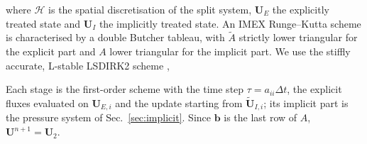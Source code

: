 where $\mathcal H$ is the spatial discretisation of the split system, $\mathbf U_E$ the explicitly treated state and $\mathbf U_I$ the
implicitly treated state. An IMEX Runge--Kutta scheme \cite{Ascher1997,PareschiRusso2005} is characterised by a double Butcher
tableau, with $\tilde A$ strictly lower triangular for the explicit part and $A$ lower triangular for the implicit part. We use the
stiffly accurate, L-stable LSDIRK2 scheme \cite{BoscarinoFilbetRusso2016,Avgerinos2019},

Each stage is the first-order scheme with the time step $\tau=a_{ii}\Delta t$, the explicit fluxes evaluated on $\mathbf U_{E,i}$ and
the update starting from $\tilde{\mathbf U}_{I,i}$; its implicit part is the pressure system of Sec.~\ref{sec:implicit}. Since $\mathbf b$
is the last row of $A$, $\mathbf U^{n+1}=\mathbf U_2$.

